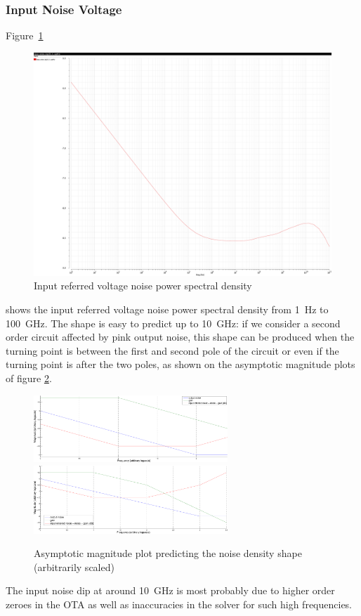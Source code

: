 \documentclass[english,10pt]{article}
\begin{document}
\subsubsection{Input Noise Voltage}\label{sub:inputNoise}
Figure~\ref{fig:noise}
\begin{figure}[htbp]
  \centering
  \includegraphics[width = \textwidth]{noise_1.pdf}
  \caption{Input referred voltage noise power spectral density\label{fig:noise}}
\end{figure}
shows the input referred voltage noise power spectral density from \SI{1}{\hertz} to \SI{100}{\giga\hertz}. The shape is easy to predict up to \SI{10}{\giga\hertz}: if we consider a second order circuit affected by pink output noise, this shape can be produced when the turning point is between the first and second pole of the circuit or even if the turning point is after the two poles, as shown on the asymptotic magnitude plots of figure \ref{fig:noiseAsym}.
\begin{figure}[htbp]
  \centering
  \includegraphics[width = 0.65\textwidth]{noiseAsym.pdf}\\
  \includegraphics[width = 0.65\textwidth]{noiseAsym2.pdf}
  \caption{Asymptotic magnitude plot predicting the noise density shape (arbitrarily scaled)\label{fig:noiseAsym}}
\end{figure}
The input noise dip at around \SI{10}{\giga\hertz} is most probably due to higher order zeroes in the OTA as well as inaccuracies in the solver for such high frequencies.
\end{document}
